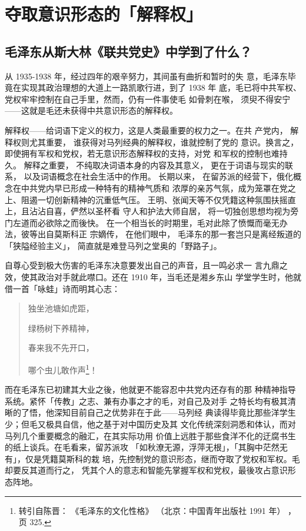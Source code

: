 \chapter{夺取意识形态的「解释权」}
\section{毛泽东从斯大林《联共党史》中学到了什么？}
从 1935-1938 年，经过四年的艰辛努力，其间虽有曲折和暂时的失
意，毛泽东毕竟在实现其政治理想的大道上一路凯歌行进，到了 1938 年
底，毛已将中共军权、党权牢牢控制在自己手里，然而，仍有一件事使毛
如骨刺在喉，
须臾不得安宁——这就是毛还未获得中共意识形态的解释权。

解释权——给词语下定义的权力，这是人类最重要的权力之一。在共
产党内，
解释权则尤其重要，
谁获得对马列经典的解释权，谁就控制了党的
意识。换言之，即使拥有军权和党权，若无意识形态解释权的支持，对党
和军权的控制也难持久。
解释之重要，
不纯取决词语本身的内容及其意义，
更在于词语与现实的联系，
以及词语概念在社会生活中的作用。
长期以来，
在留苏派的经营下，俄化概念在中共党内早已形成一种特有的精神气质和
浓厚的亲苏气氛，成为笼罩在党之上、阻遏一切创新精神的沉重低气压。
王明、张闻天等不仅凭籍这种氛围扶摇直上，且沾沾自喜，俨然以圣杯看
守人和护法大师自居，
将一切独创思想均视为旁门左道而必欲除之而後快。
在一个相当长的时期里，毛对此除了愤慨而毫无办法，彼等出自莫斯科正
宗嫡传，
在他们眼中，
毛泽东的那一套岂只是离经叛道的
「狭隘经验主义」，
简直就是难登马列之堂奥的「野路子」。

自尊心受到极大伤害的毛泽东决意要发出自己的声音，且一鸣必求一
言九鼎之效，使其政治对手就此噤口。还在 1910 年，当毛还是湘乡东山
学堂学生时，他就借一首「咏蛙」诗而明其心志：
\begin{quote}
	\fzwkai 独坐池塘如虎距，

绿杨树下养精神，

春来我不先开口，

哪个虫儿敢作声\footnote{转引自陈晋：
《毛泽东的文化性格》
（北京：中国青年出版社 1991 年）
，页 325.}！
\end{quote}

而在毛泽东已初建其大业之後，他就更不能容忍中共党内还存有的那
种精神指导系统。紧怀「传教」之志、兼有办事之才的毛，对自己及对手
之特长均有极其清晰的了悟，他深知目前自己之优势非在于此——马列经
典读得毕竟比那些洋学生少；但毛又极具自信，他之基于对中国历史及其
文化传统深刻洞悉和体认，而对马列几个重要概念的融汇，在其实际功用
价值上远胜于那些食洋不化的迂腐书生的纸上谈兵。在毛看来，留苏派攻
「如秋潦无源，浮萍无根」，「其胸中茫然无有」，仅是凭籍莫斯科的栽
培，先控制党的意识形态，继而夺取了党权和军权。毛却要反其道而行之，
凭其个人的意志和智能先掌握军权和党权，最後攻占意识形态阵地。
 
